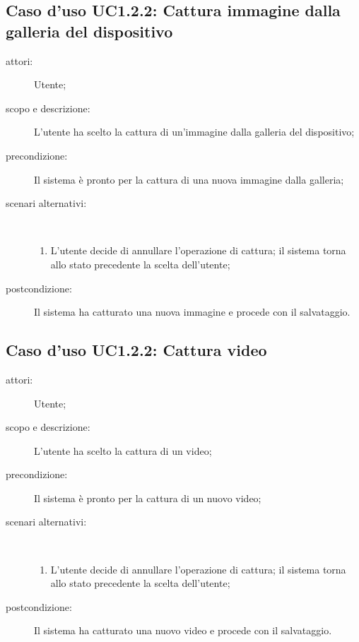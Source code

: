 \subsection{Caso d'uso UC1.2.2: Cattura immagine dalla galleria del dispositivo}
\begin{description}
\item[attori:] Utente;
\item[scopo e descrizione:] L'utente ha scelto la cattura di un'immagine dalla galleria del dispositivo;
\item[precondizione:] Il sistema è pronto per la cattura di una nuova immagine dalla galleria;
\item[scenari alternativi:] \hfill \\
	\begin{enumerate}
	\item L'utente decide di annullare l'operazione di cattura; il sistema torna allo stato precedente la scelta dell'utente;
	\end{enumerate}
\item[postcondizione:] Il sistema ha catturato una nuova immagine e procede con il salvataggio.
\end{description}

\subsection{Caso d'uso UC1.2.2: Cattura video}
\begin{description}
\item[attori:] Utente;
\item[scopo e descrizione:] L'utente ha scelto la cattura di un video;
\item[precondizione:] Il sistema è pronto per la cattura di un nuovo video;
\item[scenari alternativi:] \hfill \\
	\begin{enumerate}
	\item L'utente decide di annullare l'operazione di cattura; il sistema torna allo stato precedente la scelta dell'utente;
	\end{enumerate}
\item[postcondizione:] Il sistema ha catturato una nuovo video e procede con il salvataggio.
\end{description}

